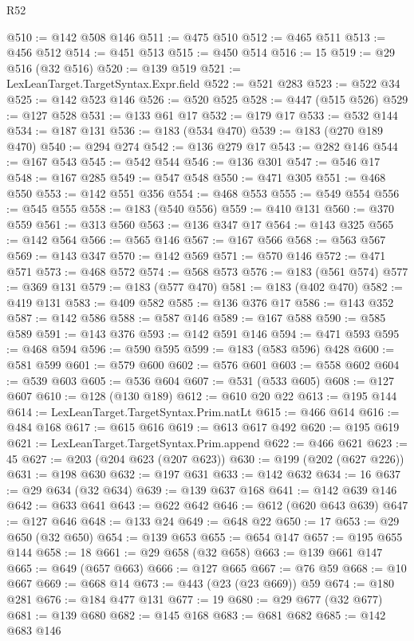 \begin{lexlean}{R52}
\begin{coremodule}
@510 := @142 @508 @146
@511 := @475 @510
@512 := @465 @511
@513 := @456 @512
@514 := @451 @513
@515 := @450 @514
@516 := 15
@519 := @29 @516 (@32 @516)
@520 := @139 @519
@521 := LexLeanTarget.TargetSyntax.Expr.field
@522 := @521 @283
@523 := @522 @34
@525 := @142 @523 @146
@526 := @520 @525
@528 := @447 (@515 @526)
@529 := @127 @528
@531 := @133 @61 @17
@532 := @179 @17
@533 := @532 @144
@534 := @187 @131
@536 := @183 (@534 @470)
@539 := @183 (@270 @189 @470)
@540 := @294 @274
@542 := @136 @279 @17
@543 := @282 @146
@544 := @167 @543
@545 := @542 @544
@546 := @136 @301
@547 := @546 @17
@548 := @167 @285
@549 := @547 @548
@550 := @471 @305
@551 := @468 @550
@553 := @142 @551 @356
@554 := @468 @553
@555 := @549 @554
@556 := @545 @555
@558 := @183 (@540 @556)
@559 := @410 @131
@560 := @370 @559
@561 := @313 @560
@563 := @136 @347 @17
@564 := @143 @325
@565 := @142 @564
@566 := @565 @146
@567 := @167 @566
@568 := @563 @567
@569 := @143 @347
@570 := @142 @569
@571 := @570 @146
@572 := @471 @571
@573 := @468 @572
@574 := @568 @573
@576 := @183 (@561 @574)
@577 := @369 @131
@579 := @183 (@577 @470)
@581 := @183 (@402 @470)
@582 := @419 @131
@583 := @409 @582
@585 := @136 @376 @17
@586 := @143 @352
@587 := @142 @586
@588 := @587 @146
@589 := @167 @588
@590 := @585 @589
@591 := @143 @376
@593 := @142 @591 @146
@594 := @471 @593
@595 := @468 @594
@596 := @590 @595
@599 := @183 (@583 @596) @428
@600 := @581 @599
@601 := @579 @600
@602 := @576 @601
@603 := @558 @602
@604 := @539 @603
@605 := @536 @604
@607 := @531 (@533 @605)
@608 := @127 @607
@610 := @128 (@130 @189)
@612 := @610 @20 @22
@613 := @195 @144
@614 := LexLeanTarget.TargetSyntax.Prim.natLt
@615 := @466 @614
@616 := @484 @168
@617 := @615 @616
@619 := @613 @617 @492
@620 := @195 @619
@621 := LexLeanTarget.TargetSyntax.Prim.append
@622 := @466 @621
@623 := 45
@627 := @203 (@204 @623 (@207 @623))
@630 := @199 (@202 (@627 @226))
@631 := @198 @630
@632 := @197 @631
@633 := @142 @632
@634 := 16
@637 := @29 @634 (@32 @634)
@639 := @139 @637 @168
@641 := @142 @639 @146
@642 := @633 @641
@643 := @622 @642
@646 := @612 (@620 @643 @639)
@647 := @127 @646
@648 := @133 @24
@649 := @648 @22
@650 := 17
@653 := @29 @650 (@32 @650)
@654 := @139 @653
@655 := @654 @147
@657 := @195 @655 @144
@658 := 18
@661 := @29 @658 (@32 @658)
@663 := @139 @661 @147
@665 := @649 (@657 @663)
@666 := @127 @665
@667 := @76 @59
@668 := @10 @667
@669 := @668 @14
@673 := @443 (@23 (@23 @669)) @59
@674 := @180 @281
@676 := @184 @477 @131
@677 := 19
@680 := @29 @677 (@32 @677)
@681 := @139 @680
@682 := @145 @168
@683 := @681 @682
@685 := @142 @683 @146

\end{coremodule}
\end{lexlean}
